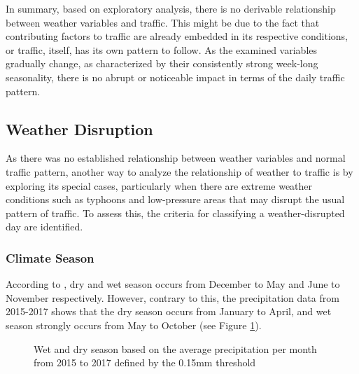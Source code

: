 In summary, based on exploratory analysis, there is no derivable relationship between weather variables and traffic. This might be due to the fact that contributing factors to traffic are already embedded in its respective conditions, or traffic, itself, has its own pattern to follow. As the examined variables gradually change, as characterized by their consistently strong week-long seasonality, there is no abrupt or noticeable impact in terms of the daily traffic pattern.

\subsection{Weather Disruption}
As there was no established relationship between weather variables and normal traffic pattern, another way to analyze the relationship of weather to traffic is by exploring its special cases, particularly when there are extreme weather conditions such as typhoons and low-pressure areas that may disrupt the usual pattern of traffic. To assess this, the criteria for classifying a weather-disrupted day are identified.

\subsubsection{Climate Season}

According to , dry and wet season occurs from December to May and June to November respectively. However, contrary to this, the precipitation data from 2015-2017 shows that the dry season occurs from January to April, and wet season strongly occurs from May to October (see Figure \ref{figure_ave_precip}).

\begin{figure}[h]
  \centering
  \captionsetup{justification=centering}
  \caption{Wet and dry season based on the average precipitation per month from 2015 to 2017 defined by the 0.15mm threshold}
\label{figure_ave_precip}
\end{figure}

